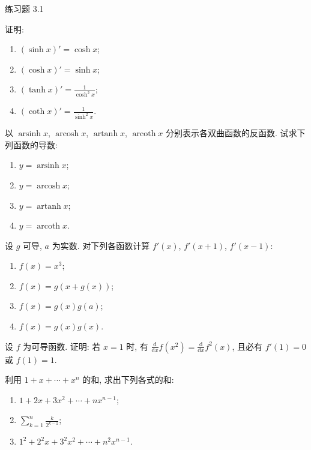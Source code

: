 \begin{exblock}{练习题 3.1}
  \item 证明:
  \begin{enumerate}[label=(\arabic*)]
    \item $(\sinh x)' = \cosh x$;
    \item $(\cosh x)' = \sinh x$;
    \item $(\tanh x)' = \frac{1}{\cosh^2 x}$;
    \item $(\coth x)' = \frac{1}{\sinh^2 x}$.
  \end{enumerate}

  \item 以 $\operatorname{arsinh} x$, $\operatorname{arcosh} x$, $\operatorname{artanh} x$, $\operatorname{arcoth} x$ 分别表示各双曲函数的反函数. 试求下列函数的导数:
  \begin{enumerate}[label=(\arabic*)]
    \item $y = \operatorname{arsinh} x$;
    \item $y = \operatorname{arcosh} x$;
    \item $y = \operatorname{artanh} x$;
    \item $y = \operatorname{arcoth} x$.
  \end{enumerate}

  \item 设 $g$ 可导, $a$ 为实数. 对下列各函数计算 $f'(x)$, $f'(x+1)$, $f'(x-1)$:
  \begin{enumerate}[label=(\arabic*)]
    \item $f(x) = x^3$;
    \item $f(x) = g(x + g(x))$;
    \item $f(x) = g(x)g(a)$;
    \item $f(x) = g(x)g(x)$.
  \end{enumerate}

  \item 设 $f$ 为可导函数. 证明: 若 $x=1$ 时, 有 $\frac{\mathrm{d}}{\mathrm{d}x}f(x^2) = \frac{\mathrm{d}}{\mathrm{d}x}f^2(x)$, 且必有 $f'(1) = 0$ 或 $f(1) = 1$.

  \item 利用 $1 + x + \cdots + x^n$ 的和, 求出下列各式的和:
  \begin{enumerate}[label=(\arabic*)]
    \item $1 + 2x + 3x^2 + \cdots + nx^{n-1}$;
    \item $\sum\limits_{k=1}^{n}\frac{k}{2^{k-1}}$;
    \item $1^2 + 2^2 x + 3^2 x^2 + \cdots + n^2 x^{n-1}$.
  \end{enumerate}


\end{exblock}
